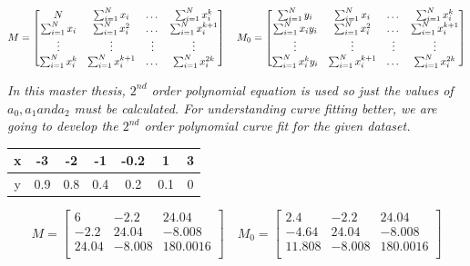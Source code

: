 \[
 M = \begin{bmatrix}
N & $$\sum_{i=1}^{N} x_{i}$$ & $\dots$ & $$\sum_{i=1}^{N} x_{i}^{k}$$ \\
$$\sum_{i=1}^{N} x_{i}$$ & $$\sum_{i=1}^{N} x_{i}^2$$ & $\dots$ & $$\sum_{i=1}^{N} x_{i}^{k+1}$$ \\
$\vdots$ & $\vdots$ & $\vdots$ & $\vdots$ \\
$$\sum_{i=1}^{N} x_{i}^{k}$$ & $$\sum_{i=1}^{N} x_{i}^{k+1}$$ & $\dots$ & $$\sum_{i=1}^{N} x_{i}^{2k}$$ \\

\end{bmatrix} \quad
 M_{0} = \begin{bmatrix}
$$\sum_{i=1}^{N} y_{i}$$ & $$\sum_{i=1}^{N} x_{i}$$ & $\dots$ & $$\sum_{i=1}^{N} x_{i}^{k}$$ \\
$$\sum_{i=1}^{N} x_{i}y_{i}$$ & $$\sum_{i=1}^{N} x_{i}^2$$ & $\dots$ & $$\sum_{i=1}^{N} x_{i}^{k+1}$$ \\
$\vdots$ & $\vdots$ & $\vdots$ & $\vdots$ \\
$$\sum_{i=1}^{N} x_{i}^{k}y_{i}$$ & $$\sum_{i=1}^{N} x_{i}^{k+1}$$ & $\dots$ & $$\sum_{i=1}^{N} x_{i}^{2k}$$ \\

\end{bmatrix}
\]

\emph{\color{blue}In this master thesis, $ 2^{nd} $ order polynomial equation is used so just the values of $ a_{0}, a_{1} and a_{2} $ must be calculated. For understanding curve fitting better, we are going to develop the $ 2^{nd} $ order polynomial curve fit for the given dataset.}

\begin{center}
  \begin{tabular}{ | c | c | c | c | c | c | c |}
    \hline
    x & -3  &  -2  &  -1  & -0.2  &  1  &  3 \\ \hline
    y & 0.9 &  0.8 &  0.4 &  0.2  & 0.1 &  0 \\
    \hline
  \end{tabular}
\end{center}

\[
 M = \begin{bmatrix}
6 & -2.2 & 24.04 \\
-2.2 & 24.04 & -8.008 \\
24.04 & -8.008 & 180.0016 \\

\end{bmatrix} \quad
 M_{0} = \begin{bmatrix}
2.4 & -2.2 & 24.04 \\
-4.64 & 24.04 & -8.008 \\
11.808 & -8.008 & 180.0016 \\

\end{bmatrix} 
\]

